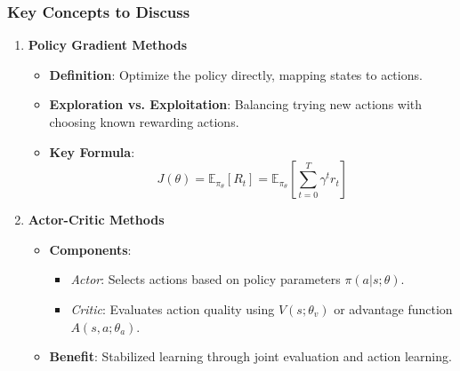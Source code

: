 \documentclass[aspectratio=169]{beamer}
\begin{document}
\begin{frame}[fragile]
    \frametitle{Key Concepts to Discuss}
    \begin{enumerate}
        \item \textbf{Policy Gradient Methods}
        \begin{itemize}
            \item \textbf{Definition}: Optimize the policy directly, mapping states to actions.
            \item \textbf{Exploration vs. Exploitation}: Balancing trying new actions with choosing known rewarding actions.
            \item \textbf{Key Formula}:
            \begin{equation}
                J(\theta) = \mathbb{E}_{\pi_\theta} [ R_t ] = \mathbb{E}_{\pi_\theta} \left[ \sum_{t=0}^T \gamma^t r_t \right]
            \end{equation}
        \end{itemize}

        \item \textbf{Actor-Critic Methods}
        \begin{itemize}
            \item \textbf{Components}:
            \begin{itemize}
                \item \textit{Actor}: Selects actions based on policy parameters $ \pi(a|s;\theta) $.
                \item \textit{Critic}: Evaluates action quality using $ V(s;\theta_v) $ or advantage function $ A(s,a;\theta_a) $.
            \end{itemize}
            \item \textbf{Benefit}: Stabilized learning through joint evaluation and action learning.
        \end{itemize}
    \end{enumerate}
\end{frame}
\end{document}

